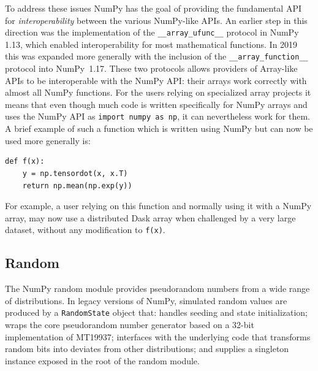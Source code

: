 \documentclass[fleqn,10pt]{wlscirep}
\newcommand{\code}[1]{\texttt{#1}}
\begin{document}
To address these issues NumPy has the goal of providing the fundamental
API for \emph{interoperability} between the various NumPy-like APIs.
An earlier step in this direction was the implementation of the
\code{\_\_array\_ufunc\_\_} protocol in NumPy 1.13, which enabled interoperability
for most mathematical functions.\cite{NEP13}
In 2019 this was expanded more generally with the inclusion of the
\code{\_\_array\_function\_\_} protocol into NumPy~1.17.
These two protocols allows providers of Array-like APIs to be interoperable
with the NumPy API: their arrays work correctly with almost all NumPy functions.\cite{NEP18}
For the users relying on specialized array projects it means that even though
much code is written specifically for NumPy arrays and uses the NumPy API as
\code{import numpy as np}, it can nevertheless work for them.
A brief example of such a function which is written using NumPy
but can now be used more generally is:
\begin{lstlisting}
def f(x):
    y = np.tensordot(x, x.T)
    return np.mean(np.exp(y))
\end{lstlisting}
For example, a user relying on this function and normally using it with a
NumPy array, may now use a distributed Dask array when challenged
by a very large dataset, without any modification to \code{f(x)}.

%
%


\subsection*{Random}


The NumPy random module provides pseudorandom numbers from a wide range of
distributions. In legacy versions of NumPy, simulated random values are produced
by a \code{RandomState} object that: handles seeding and state initialization;
wraps the core pseudorandom number generator based on a 32-bit implementation of
MT19937; interfaces with the underlying code that transforms random bits into
deviates from other distributions; and supplies a singleton instance exposed in
the root of the random module.
\end{document}

